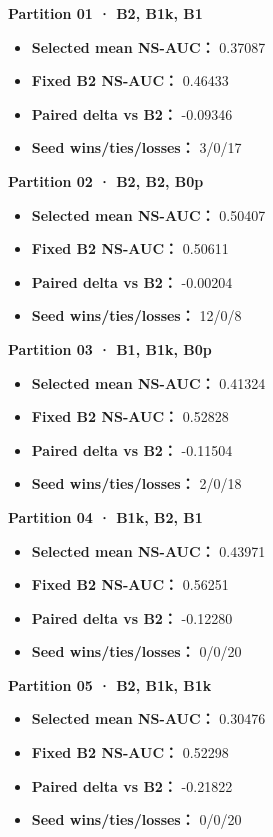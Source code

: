 \documentclass[
  10pt,
]{ctexart}
\providecommand{\tightlist}{%
  \setlength{\itemsep}{0pt}\setlength{\parskip}{0pt}}
\begin{document}
\textbf{Partition 01 · B2, B1k, B1}

\begin{itemize}
\tightlist
\item
  \textbf{Selected mean NS-AUC：} 0.37087
\item
  \textbf{Fixed B2 NS-AUC：} 0.46433
\item
  \textbf{Paired delta vs B2：} -0.09346
\item
  \textbf{Seed wins/ties/losses：} 3/0/17
\end{itemize}

\textbf{Partition 02 · B2, B2, B0p}

\begin{itemize}
\tightlist
\item
  \textbf{Selected mean NS-AUC：} 0.50407
\item
  \textbf{Fixed B2 NS-AUC：} 0.50611
\item
  \textbf{Paired delta vs B2：} -0.00204
\item
  \textbf{Seed wins/ties/losses：} 12/0/8
\end{itemize}

\textbf{Partition 03 · B1, B1k, B0p}

\begin{itemize}
\tightlist
\item
  \textbf{Selected mean NS-AUC：} 0.41324
\item
  \textbf{Fixed B2 NS-AUC：} 0.52828
\item
  \textbf{Paired delta vs B2：} -0.11504
\item
  \textbf{Seed wins/ties/losses：} 2/0/18
\end{itemize}

\textbf{Partition 04 · B1k, B2, B1}

\begin{itemize}
\tightlist
\item
  \textbf{Selected mean NS-AUC：} 0.43971
\item
  \textbf{Fixed B2 NS-AUC：} 0.56251
\item
  \textbf{Paired delta vs B2：} -0.12280
\item
  \textbf{Seed wins/ties/losses：} 0/0/20
\end{itemize}

\textbf{Partition 05 · B2, B1k, B1k}

\begin{itemize}
\tightlist
\item
  \textbf{Selected mean NS-AUC：} 0.30476
\item
  \textbf{Fixed B2 NS-AUC：} 0.52298
\item
  \textbf{Paired delta vs B2：} -0.21822
\item
  \textbf{Seed wins/ties/losses：} 0/0/20
\end{itemize}
\end{document}
